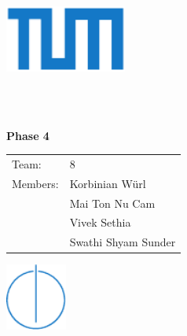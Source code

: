 \begin{titlepage}
  \centering

  \includegraphics[width=40mm]{logos/tum}

  \vspace{5mm}
  {\huge\MakeUppercase{\getFaculty{}}}\\

  \vspace{5mm}
  {\large\MakeUppercase{\getUniversity{}}}\\

  \vspace{15mm}
  {\huge\bfseries \getTitle{}}

  \vspace{10mm}
  {\huge\bfseries Phase 4}

  \vspace{15mm}
  \begin{tabular}{l l}
    Team: & 8 \\
    Members:  & Korbinian Würl \\
              & Mai Ton Nu Cam \\
              & Vivek Sethia \\
              & Swathi Shyam Sunder
  \end{tabular}

  \vspace{20mm}
  \includegraphics[width=20mm]{logos/faculty}
\end{titlepage}
